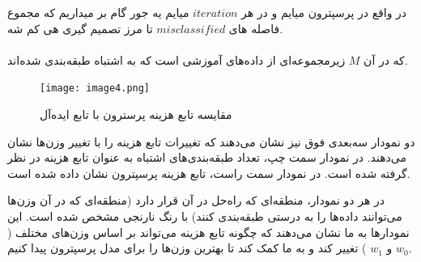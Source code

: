 \documentclass[12pt]{article}
\begin{document}
در واقع در پرسپترون میایم و در هر $iteration$ میایم یه جور گام بر میداریم که مجموع فاصله های $misclassified $ تا مرز تصمیم گیری هی کم شه.
\\
\\
که در آن \( M \) زیرمجموعه‌ای از داده‌های آموزشی است که به اشتباه طبقه‌بندی شده‌اند.
\begin{figure}
    \centering
    \texttt{[image: image4.png]}
    \caption{مقایسه تابع هزینه پرسترون با تابع ایده‌آل}
    \label{fig:}
\end{figure}
دو نمودار سه‌بعدی فوق نیز نشان می‌دهند که تغییرات تابع هزینه را با تغییر وزن‌ها نشان می‌دهند. در نمودار سمت چپ، تعداد طبقه‌بندی‌های اشتباه به عنوان تابع هزینه در نظر گرفته شده است. در نمودار سمت راست، تابع هزینه پرسپترون نشان داده شده است.

در هر دو نمودار، منطقه‌ای که راه‌حل در آن قرار دارد (منطقه‌ای که در آن وزن‌ها می‌توانند داده‌ها را به درستی طبقه‌بندی کنند) با رنگ نارنجی مشخص شده است. این نمودارها به ما نشان می‌دهند که چگونه تابع هزینه می‌تواند بر اساس وزن‌های مختلف ( \( w_0 \) و \( w_1 \) ) تغییر کند و به ما کمک کند تا بهترین وزن‌ها را برای مدل پرسپترون پیدا کنیم.
\end{document}
